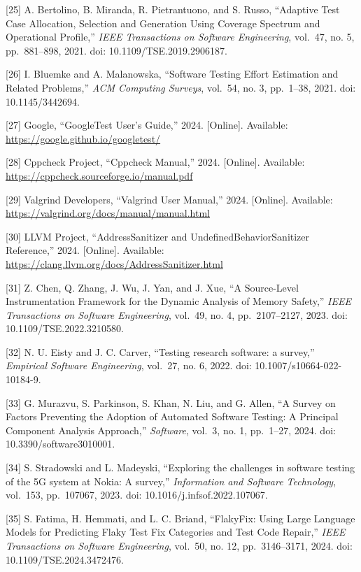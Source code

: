 \documentclass[
  12pt,
]{report}
\begin{document}
{[}25{]} A. Bertolino, B. Miranda, R. Pietrantuono, and S. Russo,
``Adaptive Test Case Allocation, Selection and Generation Using Coverage
Spectrum and Operational Profile,'' \emph{IEEE Transactions on Software
Engineering}, vol.~47, no. 5, pp.~881--898, 2021. doi:
10.1109/TSE.2019.2906187.

{[}26{]} I. Bluemke and A. Malanowska, ``Software Testing Effort
Estimation and Related Problems,'' \emph{ACM Computing Surveys},
vol.~54, no. 3, pp.~1--38, 2021. doi: 10.1145/3442694.

{[}27{]} Google, ``GoogleTest User's Guide,'' 2024. {[}Online{]}.
Available: \url{https://google.github.io/googletest/}

{[}28{]} Cppcheck Project, ``Cppcheck Manual,'' 2024. {[}Online{]}.
Available: \url{https://cppcheck.sourceforge.io/manual.pdf}

{[}29{]} Valgrind Developers, ``Valgrind User Manual,'' 2024.
{[}Online{]}. Available: \url{https://valgrind.org/docs/manual/manual.html}

{[}30{]} LLVM Project, ``Address\-Sanitizer and Undefined\-Behavior\-Sanitizer
Reference,'' 2024. {[}Online{]}. Available:
\url{https://clang.llvm.org/docs/AddressSanitizer.html}

{[}31{]} Z. Chen, Q. Zhang, J. Wu, J. Yan, and J. Xue, ``A Source-Level
Instrumentation Framework for the Dynamic Analysis of Memory Safety,''
\emph{IEEE Transactions on Software Engineering}, vol.~49, no. 4,
pp.~2107--2127, 2023. doi: 10.1109/TSE.2022.3210580.

{[}32{]} N. U. Eisty and J. C. Carver, ``Testing research software: a
survey,'' \emph{Empirical Software Engineering}, vol.~27, no. 6, 2022.
doi: 10.1007/s10664-022-10184-9.

{[}33{]} G. Murazvu, S. Parkinson, S. Khan, N. Liu, and G. Allen, ``A
Survey on Factors Preventing the Adoption of Automated Software Testing:
A Principal Component Analysis Approach,'' \emph{Software}, vol.~3, no.
1, pp.~1--27, 2024. doi: 10.3390/software3010001.

{[}34{]} S. Stradowski and L. Madeyski, ``Exploring the challenges in
software testing of the 5G system at Nokia: A survey,''
\emph{Information and Software Technology}, vol.~153, pp.~107067, 2023.
doi: 10.1016/j.infsof.2022.107067.

{[}35{]} S. Fatima, H. Hemmati, and L. C. Briand, ``FlakyFix: Using
Large Language Models for Predicting Flaky Test Fix Categories and Test
Code Repair,'' \emph{IEEE Transactions on Software Engineering},
vol.~50, no. 12, pp.~3146--3171, 2024. doi: 10.1109/TSE.2024.3472476.
\end{document}
